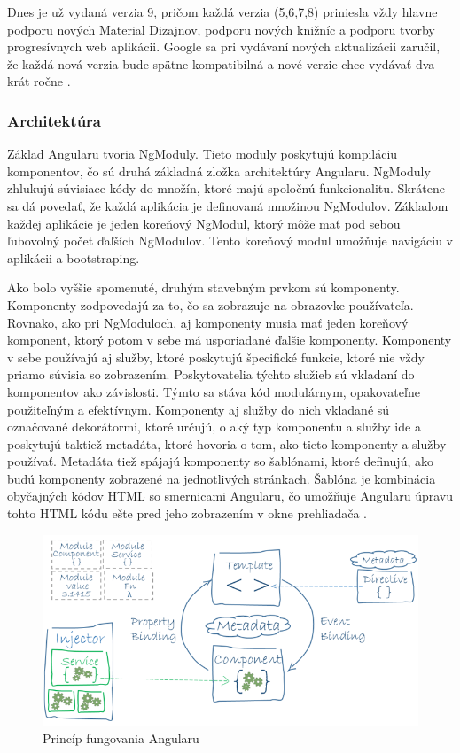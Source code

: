 \indent Dnes je už vydaná verzia 9, pričom každá verzia (5,6,7,8) priniesla vždy hlavne podporu nových Material Dizajnov, podporu nových knižníc a podporu tvorby progresívnych web aplikácii. Google sa pri vydávaní nových aktualizácii zaručil, že každá nová verzia bude spätne kompatibilná a nové verzie chce vydávať dva krát ročne \cite{bakalarska_praca,angular_1}.

\subsubsection{Architektúra}
\indent Základ Angularu tvoria NgModuly. Tieto moduly poskytujú kompiláciu komponentov, čo sú druhá základná zložka architektúry Angularu. NgModuly zhlukujú súvisiace kódy do množín, ktoré majú spoločnú funkcionalitu. Skrátene sa dá povedať, že každá aplikácia je definovaná množinou NgModulov. Základom každej aplikácie je jeden koreňový NgModul, ktorý môže mať pod sebou ľubovolný počet ďaľších NgModulov. Tento koreňový modul umožňuje navigáciu v aplikácii a bootstraping. 

\indent Ako bolo vyššie spomenuté, druhým stavebným prvkom sú komponenty. Komponenty zodpovedajú za to, čo sa zobrazuje na obrazovke používateľa. Rovnako, ako pri NgModuloch, aj komponenty musia mať jeden koreňový komponent, ktorý potom v sebe má usporiadané ďalšie komponenty. Komponenty v sebe používajú aj služby, ktoré poskytujú špecifické funkcie, ktoré nie vždy priamo súvisia so zobrazením. Poskytovatelia týchto služieb sú vkladaní do komponentov ako závislosti. Týmto sa stáva kód modulárnym, opakovateľne použiteľným a efektívnym. Komponenty aj služby do nich vkladané sú označované dekorátormi, ktoré určujú, o aký typ komponentu a služby ide a poskytujú taktiež metadáta, ktoré hovoria o tom, ako tieto komponenty a služby používať. Metadáta tiež spájajú komponenty so šablónami, ktoré definujú, ako budú komponenty zobrazené na jednotlivých stránkach. Šablóna je kombinácia obyčajných kódov HTML so smernicami Angularu, čo umožňuje Angularu úpravu tohto HTML kódu ešte pred jeho zobrazením v okne prehliadača \cite{angular_3}. 

\begin{figure}[H]
    \centering
    \includegraphics[scale=0.5]{img/angular_architecture.png}
    \caption{Princíp fungovania Angularu \cite{angular_3}}
    \label{fig:angular_architecture}
\end{figure}

